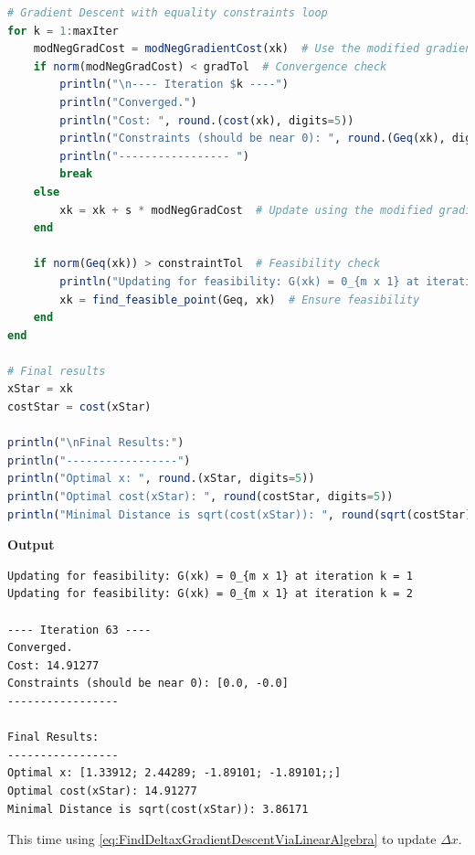 \begin{lstlisting}[language=Julia,style=mystyle]
# Gradient Descent with equality constraints loop
for k = 1:maxIter
    modNegGradCost = modNegGradientCost(xk)  # Use the modified gradient cost function
    if norm(modNegGradCost) < gradTol  # Convergence check
        println("\n---- Iteration $k ----")
        println("Converged.")
        println("Cost: ", round.(cost(xk), digits=5))
        println("Constraints (should be near 0): ", round.(Geq(xk), digits=6))
        println("----------------- ")
        break
    else
        xk = xk + s * modNegGradCost  # Update using the modified gradient
    end
    
    if norm(Geq(xk)) > constraintTol  # Feasibility check
        println("Updating for feasibility: G(xk) = 0_{m x 1} at iteration k = $k")
        xk = find_feasible_point(Geq, xk)  # Ensure feasibility
    end
end

# Final results
xStar = xk
costStar = cost(xStar)

println("\nFinal Results:")
println("-----------------")
println("Optimal x: ", round.(xStar, digits=5))
println("Optimal cost(xStar): ", round(costStar, digits=5))
println("Minimal Distance is sqrt(cost(xStar)): ", round(sqrt(costStar), digits=5))
\end{lstlisting}
\textbf{Output} 
\begin{verbatim}
Updating for feasibility: G(xk) = 0_{m x 1} at iteration k = 1
Updating for feasibility: G(xk) = 0_{m x 1} at iteration k = 2

---- Iteration 63 ----
Converged.
Cost: 14.91277
Constraints (should be near 0): [0.0, -0.0]
----------------- 

Final Results:
-----------------
Optimal x: [1.33912; 2.44289; -1.89101; -1.89101;;]
Optimal cost(xStar): 14.91277
Minimal Distance is sqrt(cost(xStar)): 3.86171

\end{verbatim}

\solution This time using \eqref{eq:FindDeltaxGradientDescentViaLinearAlgebra} to update $\Delta x$.


